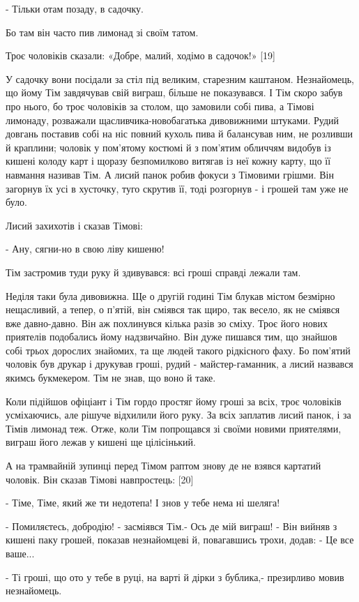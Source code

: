 - Тільки отам позаду, в садочку.

Бо там він часто пив лимонад зі своїм татом.

Троє чоловіків сказали: «Добре, малий, ходімо в садочок!» [19]

У садочку вони посідали за стіл під великим, старезним каштаном. Незнайомець, що йому Тім завдячував свій виграш, більше не показувався. І Тім скоро забув про нього, бо троє чоловіків за столом, що замовили собі пива, а Тімові лимонаду, розважали щасливчика-новобагатька дивовижними штуками. Рудий довгань поставив собі на ніс повний кухоль пива й балансував ним, не розливши й краплини; чоловік у пом'ятому костюмі й з пом'ятим обличчям видобув із кишені колоду карт і щоразу безпомилково витягав із неї кожну карту, що її навмання називав Тім. А лисий панок робив фокуси з Тімовими грішми. Він загорнув їх усі в хусточку, туго скрутив її, тоді розгорнув - і грошей там уже не було.

Лисий захихотів і сказав Тімові:

- Ану, сягни-но в свою ліву кишеню!

Тім застромив туди руку й здивувався: всі гроші справді лежали там.

Неділя таки була дивовижна. Ще о другій годині Тім блукав містом безмірно нещасливий, а тепер, о п'ятій, він сміявся так щиро, так весело, як не сміявся вже давно-давно. Він аж похлинувся кілька разів зо сміху. Троє його нових приятелів подобались йому надзвичайно. Він дуже пишався тим, що знайшов собі трьох дорослих знайомих, та ще людей такого рідкісного фаху. Бо пом'ятий чоловік був друкар і друкував гроші, рудий - майстер-гаманник, а лисий назвався якимсь букмекером. Тім не знав, що воно й таке.

Коли підійшов офіціант і Тім гордо простяг йому гроші за всіх, троє чоловіків усміхаючись, але рішуче відхилили його руку. За всіх заплатив лисий панок, і за Тімів лимонад теж. Отже, коли Тім попрощався зі своїми новими приятелями, виграш його лежав у кишені ще цілісінький.

А на трамвайній зупинці перед Тімом раптом знову де не взявся картатий чоловік. Він сказав Тімові навпростець: [20]

- Тіме, Тіме, який же ти недотепа! І знов у тебе нема ні шеляга!

- Помиляєтесь, добродію! - засміявся Тім.- Ось де мій виграш! - Він вийняв з кишені паку грошей, показав незнайомцеві й, повагавшись трохи, додав: - Це все ваше...

- Ті гроші, що ото у тебе в руці, на варті й дірки з бублика,- презирливо мовив незнайомець.


